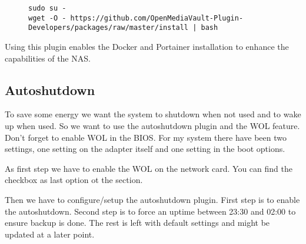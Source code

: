 \begin{figure}[H]
    \centering
    \begin{tiny}
        \begin{BVerbatim}
sudo su -
wget -O - https://github.com/OpenMediaVault-Plugin-Developers/packages/raw/master/install | bash
        \end{BVerbatim}
    \end{tiny}
\end{figure}

Using this plugin enables the \gls{Docker} and \gls{Portainer} installation
to enhance the capabilities of the \gls{NAS}.


\subsection{Autoshutdown}

To save some energy we want the system to shutdown when not used and to wake up
when used. So we want to use the autoshutdown plugin and the \gls{WOL} feature.
 Don't forget to enable \gls{WOL} in the BIOS. For my system
there have been two settings, one setting on the adapter itself and one setting
in the boot options.


As first step we have to enable the \gls{WOL} on the network card. You can find
the checkbox as last option ot the  section.


Then we have to configure/setup the autoshutdown plugin. First step is to
enable the autoshutdown. Second step is to force an uptime between 23:30 and
02:00 to ensure backup is done. The rest is left with default settings and
might be updated at a later point.



